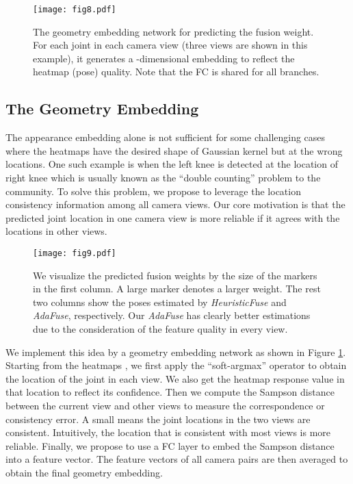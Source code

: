 \begin{figure}[]
    \centering
    \texttt{[image: fig8.pdf]}
    \caption{The geometry embedding network for predicting the fusion weight. For each joint in each camera view (three views are shown in this example), it generates a -dimensional embedding to reflect the heatmap (pose) quality. Note that the FC is shared for all branches.}
    \label{fig:geometric}
\end{figure}



\subsection{The Geometry Embedding}
The appearance embedding alone is not sufficient for some challenging cases where the heatmaps have the desired shape of Gaussian kernel but at the wrong locations. One such example is when the left knee is detected at the location of right knee which is usually known as the ``double counting'' problem to the community. To solve this problem, we propose to leverage the location consistency information among all camera views. Our core motivation is that the predicted joint location in one camera view is more reliable if it agrees with the locations in other views.


\begin{figure}[hb]
    \centering
    \texttt{[image: fig9.pdf]}
    \caption{We visualize the predicted fusion weights by the size of the markers in the first column. A large marker denotes a larger weight. The rest two columns show the  poses estimated by \emph{HeuristicFuse} and \emph{AdaFuse}, respectively. Our \emph{AdaFuse} has clearly better estimations due to the consideration of the feature quality in every view.}
    \label{fig:weights}
\end{figure}

We implement this idea by a geometry embedding network as shown in Figure \ref{fig:geometric}. Starting from the heatmaps , we first apply the ``soft-argmax'' operator \citep{sun2018integral} to obtain the location  of the joint in each view. We also get the heatmap response value  in that location to reflect its confidence. Then we compute the Sampson distance \citep{hartley2003multiple}  between the current view and other views to measure the correspondence or consistency error. A small  means the joint locations in the two views are consistent. Intuitively, the location that is consistent with most views is more reliable. Finally, we propose to use a FC layer to embed the Sampson distance into a feature vector. The feature vectors of all camera pairs are then averaged to obtain the final geometry embedding.






